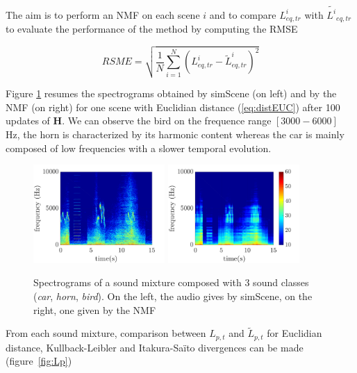 \documentclass{article}
\begin{document}
\begin{sloppy}
The aim is to perform an NMF on each scene $i$ and to compare $L^i_{eq,tr}$ with $\tilde{L^i}_{eq,tr}$ to evaluate the performance of the method by computing the RMSE

\begin{equation}
RSME = \sqrt{\frac{1}{N}\sum_{i = 1}^N(L^i_{eq,tr}-\tilde{L}^i_{eq,tr})^2}
\end{equation}

Figure \ref{fig:spectrogram} resumes the spectrograms obtained by simScene (on left) and by the NMF (on right) for one scene with Euclidian distance (\ref{eq:distEUC}) after 100 updates of $\mathbf{H}$. We can observe the bird on the frequence range $\left[3000-6000\right]$ Hz, the horn is characterized by its harmonic content whereas the car is mainly composed of low frequencies with a slower temporal evolution.\\

\begin{figure}[t]
\centering
\includegraphics[width=5cm]{images/bvak_Sc2_Vscene_spectre_Euc.pdf}
\includegraphics[width=5cm]{images/bvak_Sc2_Vapprox_spectre_Euc.pdf}
\caption{Spectrograms of a sound mixture composed with 3 sound classes (\textit{car}, \textit{horn}, \textit{bird}). On the left, the audio gives by simScene, on the right, one given by the NMF}
\label{fig:spectrogram}
\end{figure}


From each sound mixture, comparison between $L_{p,t}$ and $\tilde{L}_{p,t}$ for Euclidian distance, Kullback-Leibler and Itakura-Saïto divergences can be made (figure~\ref{fig:Lp})\\


\end{sloppy}
\end{document}
